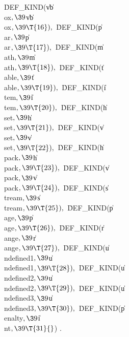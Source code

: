 \.{DEF\_KIND}(\|v\J\|b\J\\{ox}${},\39{}$\|v\J\|b\J\\{ox}${},\39\T{16}),{}$\6
\.{DEF\_KIND}(\|p\J\\{ar}${},\39{}$\|p\J\\{ar}${},\39\T{17}),{}$\6
\.{DEF\_KIND}(\|m\J\\{ath}${},\39{}$\|m\J\\{ath}${},\39\T{18}),{}$\6
\.{DEF\_KIND}(\|t\J\\{able}${},\39{}$\|t\J\\{able}${},\39\T{19}),{}$\6
\.{DEF\_KIND}(\|i\J\\{tem}${},\39{}$\|i\J\\{tem}${},\39\T{20}),{}$\6
\.{DEF\_KIND}(\|h\J\\{set}${},\39{}$\|h\J\\{set}${},\39\T{21}),{}$\6
\.{DEF\_KIND}(\|v\J\\{set}${},\39{}$\|v\J\\{set}${},\39\T{22}),{}$\6
\.{DEF\_KIND}(\|h\J\\{pack}${},\39{}$\|h\J\\{pack}${},\39\T{23}),{}$\6
\.{DEF\_KIND}(\|v\J\\{pack}${},\39{}$\|v\J\\{pack}${},\39\T{24}),{}$\6
\.{DEF\_KIND}(\|s\J\\{tream}${},\39{}$\|s\J\\{tream}${},\39\T{25}),{}$\6
\.{DEF\_KIND}(\|p\J\\{age}${},\39{}$\|p\J\\{age}${},\39\T{26}),{}$\6
\.{DEF\_KIND}(\|r\J\\{ange}${},\39{}$\|r\J\\{ange}${},\39\T{27}),{}$\6
\.{DEF\_KIND}(\|u\J\\{ndefined1}${},\39{}$\|u\J\\{ndefined1}${},\39\T{28}),{}$\6
\.{DEF\_KIND}(\|u\J\\{ndefined2}${},\39{}$\|u\J\\{ndefined2}${},\39\T{29}),{}$\6
\.{DEF\_KIND}(\|u\J\\{ndefined3}${},\39{}$\|u\J\\{ndefined3}${},\39\T{30}),{}$\6
\.{DEF\_KIND}(\|p\J\\{enalty}${},\39{}$\|i\J\\{nt}${},\39\T{31}{}$)\hbox{}
.\Y
\fi

